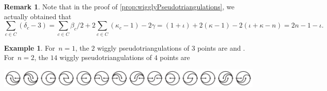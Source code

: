 \documentclass{amsart}
\theoremstyle{definition}
\newtheorem{example}[theorem]{Example}
\newtheorem{remark}[theorem]{Remark}
\begin{document}
\pagebreak
\begin{remark}
Note that in the proof of \cref{prop:wigglyPseudotriangulations}, we actually obtained that
\[
\sum_{c \in C} (\delta_c-3) = \sum_{c \in C} \beta_c/2 + 2 \sum_{c \in C} (\kappa_c-1) - 2\gamma = (1+\iota) + 2(\kappa-1) - 2(\iota+\kappa-n) = 2n-1-\iota.
\]
\end{remark}

\begin{example}
\label{exm:allSmallWigglyPseudotriangulations}
For~$n = 1$, the $2$ wiggly pseudotriangulations of $3$ points are  and .
For~${n = 2}$, the $14$ wiggly pseudotriangulations of $4$ points are \\[.2cm]
\centerline{\includegraphics[scale=.8]{wigglyPseudotriangulations}}
\end{example}
\end{document}
